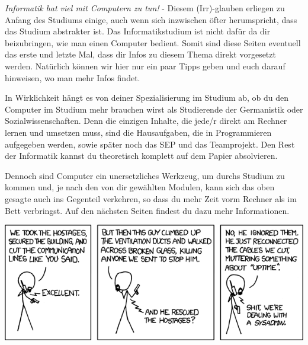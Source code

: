 \begin{multicols}{2}
\emph{Informatik hat viel mit Computern zu tun!} - Diesem (Irr)-glauben erliegen zu Anfang des Studiums einige, auch wenn sich inzwischen öfter herumspricht, dass das Studium abstrakter ist. Das Informatikstudium ist nicht dafür da dir beizubringen, wie man einen Computer bedient. Somit sind diese Seiten eventuell das erste und letzte Mal,  dass dir Infos zu diesem Thema direkt vorgesetzt werden. Natürlich können wir hier nur ein paar Tipps geben und euch darauf hinweisen, wo man mehr Infos  findet.

In Wirklichkeit hängt es von deiner Spezialisierung im Studium ab, ob  du den Computer im Studium mehr brauchen wirst als  Studierende der Germanistik oder Sozialwissenschaften. Denn die einzigen Inhalte,  die jede/r direkt am Rechner lernen und umsetzen muss, sind die Hausaufgaben,  die in Programmieren aufgegeben werden, sowie später noch das SEP und das Teamprojekt. Den Rest der Informatik kannst du theoretisch komplett auf dem Papier absolvieren.

Dennoch sind Computer ein unersetzliches Werkzeug, um durchs Studium zu kommen und, je nach den von dir gewählten Modulen, kann sich das oben gesagte auch ins Gegenteil verkehren, so dass du mehr Zeit vorm Rechner als im Bett verbringst. Auf den nächsten Seiten findest du dazu mehr Informationen.






\end{multicols}

\vspace{4cm}
\begin{center}
		\includegraphics[totalheight=6cm]{bilder/XKCD/devotion_to_duty}
\end{center}
